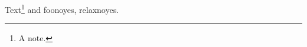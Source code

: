 \documentclass{article}
\begin{document}
\def\ifdefined#1#2#3{\expandafter\ifx\csname#1\endcsname\relax#3\else#2\fi}
Text\footnote{A note.}\label{x} and \ifdefined{foo}{yes}{no}, \ifdefined{relax}{yes}{no}.
\end{document}
